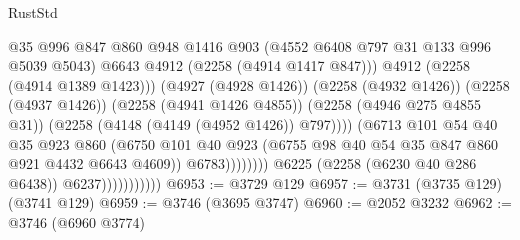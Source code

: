 \begin{lexlean}{RustStd}
\begin{coremodule}
                                                @35
                                                @996
                                                @847
                                                @860
                                                @948
                                                @1416
                                                @903
                                                (@4552 @6408 @797 @31 @133 @996 @5039 @5043)
                                                @6643
                                                @4912
                                                (@2258 (@4914 @1417 @847)))
                                              @4912
                                              (@2258 (@4914 @1389 @1423)))
                                            (@4927 (@4928 @1426))
                                            (@2258 (@4932 @1426))
                                            (@2258 (@4937 @1426))
                                            (@2258 (@4941 @1426 @4855))
                                            (@2258 (@4946 @275 @4855 @31))
                                            (@2258 (@4148 (@4149 (@4952 @1426)) @797))))
                                        (@6713
                                          @101
                                          @54
                                          @40
                                          @35
                                          @923
                                          @860
                                          (@6750
                                            @101
                                            @40
                                            @923
                                            (@6755
                                              @98
                                              @40
                                              @54
                                              @35
                                              @847
                                              @860
                                              @921
                                              @4432
                                              @6643
                                              @4609))
                                          @6783))))))))
                          @6225
                          (@2258 (@6230 @40 @286 @6438))
                          @6237)))))))))))
@6953 := @3729 @129
@6957 := @3731 (@3735 @129) (@3741 @129)
@6959 := @3746 (@3695 @3747)
@6960 := @2052 @3232
@6962 := @3746 (@6960 @3774)

\end{coremodule}
\end{lexlean}
